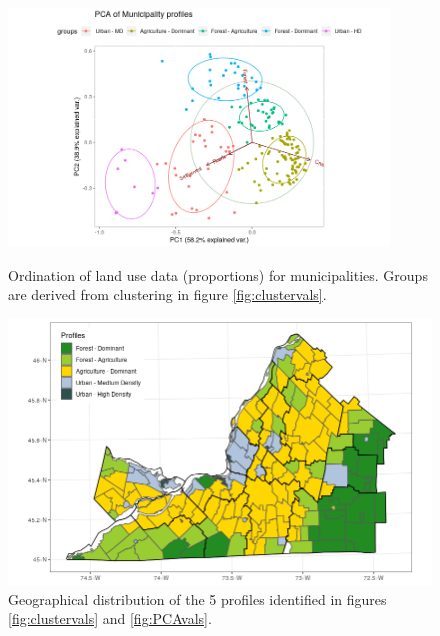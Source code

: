 \begin{figure}[h!]
  \centering
    \includegraphics[width=0.9\textwidth]{thesis/figures/PCA_data_profiles.png}
  \caption{Ordination of land use data (proportions) for municipalities. Groups are derived from clustering in figure \ref{fig:clustervals}.}
  \label{fig:PCAvals}

  \centering
    \includegraphics[width=\textwidth]{thesis/figures/profiles_land_use.png}
  \caption{Geographical distribution of the 5 profiles identified in figures \ref{fig:clustervals} and \ref{fig:PCAvals}.}
  \label{fig:mapvals}
\end{figure}


